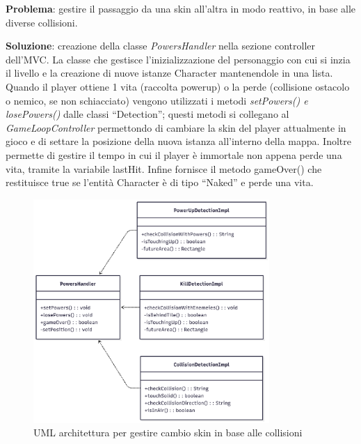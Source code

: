 \documentclass[a4paper,12pt]{report}
\begin{document}
\textbf{Problema}: gestire il passaggio da una skin all'altra in modo reattivo, in base alle diverse collisioni.\vspace{1cm}

\textbf{Soluzione}: creazione della classe \emph{PowersHandler} nella sezione controller dell'MVC. La classe che gestisce l'inizializzazione del 
personaggio con cui si inzia il livello e la creazione di nuove istanze Character mantenendole in una lista. Quando il player ottiene 
1 vita (raccolta powerup) o la perde (collisione ostacolo o nemico, se non schiacciato) vengono utilizzati i metodi \emph{setPowers() e 
losePowers()} dalle classi “Detection”; questi metodi si collegano al \emph{GameLoopController} permettondo di cambiare la skin del player 
attualmente in gioco e di settare la posizione della nuova istanza all'interno della mappa. Inoltre permette di 
gestire il tempo in cui il player è immortale non appena perde una vita, tramite la variabile lastHit.
Infine fornisce il metodo gameOver() che restituisce true se l'entità Character è di tipo “Naked” e perde una vita.

\begin{figure}[H]
    \centering
    \includegraphics[width=0.8\textwidth]{resources/PowersHandler.png}
    \caption{UML architettura per gestire cambio skin in base alle collisioni}
    \label{fig:2.5}
\end{figure}
\end{document}
